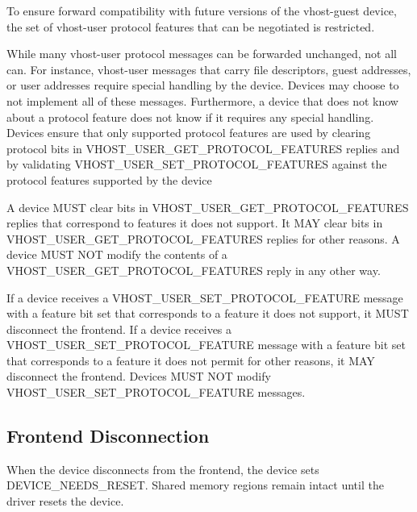 To ensure forward compatibility with future versions of the
vhost-guest device, the set of vhost-user protocol features
that can be negotiated is restricted.

While many vhost-user protocol messages can be forwarded
unchanged, not all can. For instance, vhost-user messages that
carry file descriptors, guest addresses, or user addresses
require special handling by the device. Devices may choose to not
implement all of these messages. Furthermore, a device that does
not know about a protocol feature does not know if it requires
any special handling. Devices ensure that only supported
protocol features are used by clearing protocol bits in
VHOST_USER_GET_PROTOCOL_FEATURES replies and by validating
VHOST_USER_SET_PROTOCOL_FEATURES against the protocol features
supported by the device


A device MUST clear bits in VHOST_USER_GET_PROTOCOL_FEATURES
replies that correspond to features it does not support. It MAY
clear bits in VHOST_USER_GET_PROTOCOL_FEATURES replies for other
reasons. A device MUST NOT modify the contents of a
VHOST_USER_GET_PROTOCOL_FEATURES reply in any other way.

If a device receives a VHOST_USER_SET_PROTOCOL_FEATURE message
with a feature bit set that corresponds to a feature it does not
support, it MUST disconnect the frontend. If a device receives a
VHOST_USER_SET_PROTOCOL_FEATURE message with a feature bit set
that corresponds to a feature it does not permit for other
reasons, it MAY disconnect the frontend. Devices MUST NOT modify
VHOST_USER_SET_PROTOCOL_FEATURE messages.

\subsection{Frontend Disconnection}\label{sec:Device Types / Vhost-Guest Device / Frontend Disconnection}

When the device disconnects from the frontend, the device sets
DEVICE_NEEDS_RESET. Shared memory regions remain intact until the
driver resets the device.


